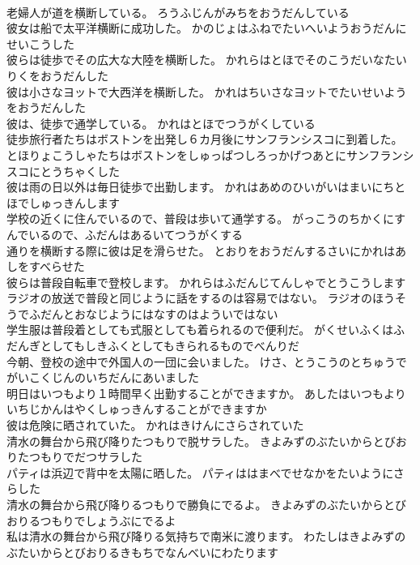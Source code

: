 \documentclass[8pt]{extreport}
\begin{document}
\begin{CJK}{UTF8}{min}
\\	老婦人が道を横断している。	ろうふじんがみちをおうだんしている 
\\	彼女は船で太平洋横断に成功した。	かのじょはふねでたいへいようおうだんにせいこうした 
\\	彼らは徒歩でその広大な大陸を横断した。	かれらはとほでそのこうだいなたいりくをおうだんした 
\\	彼は小さなヨットで大西洋を横断した。	かれはちいさなヨットでたいせいようをおうだんした 
\\	彼は、徒歩で通学している。	かれはとほでつうがくしている 
\\	徒歩旅行者たちはボストンを出発し６カ月後にサンフランシスコに到着した。	とほりょこうしゃたちはボストンをしゅっぱつしろっかげつあとにサンフランシスコにとうちゃくした 
\\	彼は雨の日以外は毎日徒歩で出勤します。	かれはあめのひいがいはまいにちとほでしゅっきんします 
\\	学校の近くに住んでいるので、普段は歩いて通学する。	がっこうのちかくにすんでいるので、ふだんはあるいてつうがくする 
\\	通りを横断する際に彼は足を滑らせた。	とおりをおうだんするさいにかれはあしをすべらせた 
\\	彼らは普段自転車で登校します。	かれらはふだんじてんしゃでとうこうします 
\\	ラジオの放送で普段と同じように話をするのは容易ではない。	ラジオのほうそうでふだんとおなじようにはなすのはよういではない 
\\	学生服は普段着としても式服としても着られるので便利だ。	がくせいふくはふだんぎとしてもしきふくとしてもきられるものでべんりだ 
\\	今朝、登校の途中で外国人の一団に会いました。	けさ、とうこうのとちゅうでがいこくじんのいちだんにあいました 
\\	明日はいつもより１時間早く出勤することができますか。	あしたはいつもよりいちじかんはやくしゅっきんすることができますか 
\\	彼は危険に晒されていた。	かれはきけんにさらされていた 
\\	清水の舞台から飛び降りたつもりで脱サラした。	きよみずのぶたいからとびおりたつもりでだつサラした 
\\	パティは浜辺で背中を太陽に晒した。	パティははまべでせなかをたいようにさらした 
\\	清水の舞台から飛び降りるつもりで勝負にでるよ。	きよみずのぶたいからとびおりるつもりでしょうぶにでるよ 
\\	私は清水の舞台から飛び降りる気持ちで南米に渡ります。	わたしはきよみずのぶたいからとびおりるきもちでなんべいにわたります 

\end{CJK}
\end{document}
